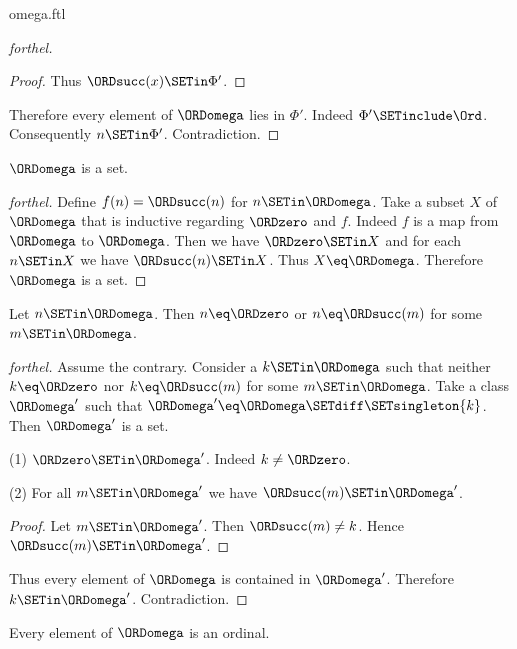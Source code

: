 \documentclass{naproche-library}
\begin{document}
\begin{smodule}[title=The Ordinal $\omega$]{omega.ftl}
\begin{proof}[forthel]
\begin{proof}
    Thus $\ORDsucc(x) \SETin \Phi'$.
  \end{proof}

  Therefore every element of $\ORDomega$ lies in $\Phi'$.
  Indeed $\Phi' \SETinclude \Ord$.
  Consequently $n \SETin \Phi'$.
  Contradiction.
\end{proof}

\begin{corollary}[forthel,id=SET_THEORY_03_4847727433220096]
  $\ORDomega$ is a set.
\end{corollary}
\begin{proof}[forthel]
  Define $f(n) = \ORDsucc(n)$ for $n \SETin \ORDomega$.
  Take a subset $X$ of $\ORDomega$ that is inductive regarding $\ORDzero$ and $f$.
  Indeed $f$ is a map from $\ORDomega$ to $\ORDomega$.
  Then we have $\ORDzero \SETin X$ and for each $n \SETin X$ we have $\ORDsucc(n) \SETin X$.
  Thus $X \eq \ORDomega$.
  Therefore $\ORDomega$ is a set.
\end{proof}

\begin{proposition}[forthel,id=SET_THEORY_03_5885789275684864]
  Let $n \SETin \ORDomega$.
  Then $n \eq \ORDzero$ or $n \eq \ORDsucc(m)$ for some $m \SETin \ORDomega$.
\end{proposition}
\begin{proof}[forthel]
  Assume the contrary.
  Consider a $k \SETin \ORDomega$ such that neither $k \eq \ORDzero$ nor $k \eq \ORDsucc(m)$ for
  some $m \SETin \ORDomega$.
  Take a class $\ORDomega'$ such that $\ORDomega' \eq \ORDomega \SETdiff \SETsingleton{k}$. %
  Then $\ORDomega'$ is a set.

  (1) $\ORDzero \SETin \ORDomega'$.
  Indeed $k \neq \ORDzero$.

  (2) For all $m \SETin \ORDomega'$ we have $\ORDsucc(m) \SETin \ORDomega'$.
  \begin{proof}
    Let $m \SETin \ORDomega'$.
    Then $\ORDsucc(m) \neq k$.
    Hence $\ORDsucc(m) \SETin \ORDomega'$.
  \end{proof}

  Thus every element of $\ORDomega$ is contained in $\ORDomega'$.
  Therefore $k \SETin \ORDomega'$.
  Contradiction.
\end{proof}

\begin{proposition}[forthel,id=SET_THEORY_03_5057540872208384]
  Every element of $\ORDomega$ is an ordinal.
\end{proposition}
\end{smodule}
\end{document}
